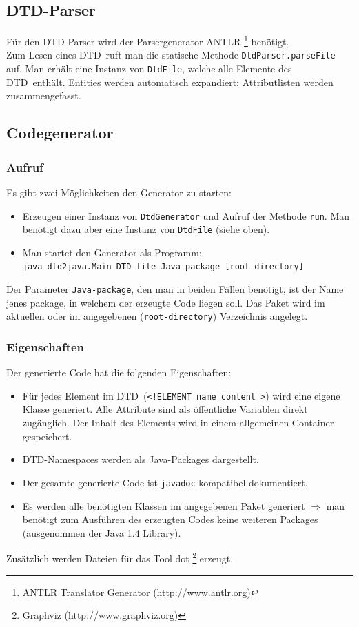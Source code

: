 \documentclass [a4paper,12pt] {scrartcl}
\newcommand{\DTD}{{\sffamily\small DTD}}
\begin{document}
\subsection{DTD-Parser}
F{\"u}r den \DTD-Parser wird der Parsergenerator \textsf{ANTLR}
\footnote{ANTLR Translator Generator (http://www.antlr.org)}
ben{\"o}tigt.\\
Zum Lesen eines \DTD\ ruft man die statische Methode \texttt{DtdParser.parseFile} auf.
Man erh{\"a}lt eine Instanz von \texttt{DtdFile}, welche alle Elemente des \DTD\ enth{\"a}lt.
Entities werden automatisch expandiert; Attributlisten werden zusammengefasst.

\subsection{Codegenerator}
\subsubsection{Aufruf}
Es gibt zwei M{\"o}glichkeiten den Generator zu starten:
\begin{itemize}
\item Erzeugen einer Instanz von \texttt{DtdGenerator} und Aufruf der Methode \texttt{run}.
    Man ben{\"o}tigt dazu aber eine Instanz von \texttt{DtdFile} (siehe oben).
\item Man startet den Generator als Programm:\\
    \texttt{java dtd2java.Main \DTD-file Java-package [root-directory]}
\end{itemize}
Der Parameter \texttt{Java-package}, den man in beiden F{\"a}llen ben{\"o}tigt, ist der Name
jenes package, in welchem der erzeugte Code liegen soll. Das Paket wird im aktuellen
oder im angegebenen (\texttt{root-directory})
Verzeichnis angelegt.
\subsubsection{Eigenschaften}
Der generierte Code hat die folgenden Eigenschaften:
\begin{itemize}
\item F{\"u}r jedes Element im \DTD\ (\texttt{<!ELEMENT name content >})
    wird eine eigene Klasse generiert. Alle Attribute sind als {\"o}ffentliche Variablen
    direkt zug{\"a}nglich. Der Inhalt des Elements wird in einem allgemeinen Container gespeichert.
\item \DTD-Namespaces werden als Java-Packages dargestellt.
\item Der gesamte generierte Code ist \texttt{javadoc}-kompatibel dokumentiert.
\item Es werden alle ben{\"o}tigten Klassen im angegebenen Paket generiert
    $\Rightarrow$ man ben{\"o}tigt zum Ausf{\"u}hren des erzeugten Codes keine
    weiteren Packages (ausgenommen der Java 1.4 Library).
\end{itemize}
Zus{\"a}tzlich werden Dateien f{\"u}r das Tool \textsf{dot}
\footnote{Graphviz (http://www.graphviz.org)}
erzeugt.
\end{document}
